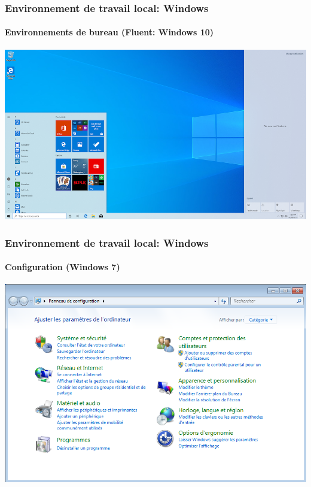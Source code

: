 \documentclass{beamer}
\begin{document}
\begin{frame}
\frametitle{Environnement de travail local: Windows}
\framesubtitle{Environnements de bureau (Fluent: Windows 10)}

\begin{center}
	\includegraphics[height=
	.8\textheight]{../img/Bweb01-environnement/win10.png}
\end{center}

\end{frame}

\begin{frame}
\frametitle{Environnement de travail local: Windows}
\framesubtitle{Configuration (Windows 7)}

\begin{center}
	\includegraphics[height=
	.8\textheight]{../img/Bweb01-environnement/win7-config.png}
\end{center}

\end{frame}
\end{document}
